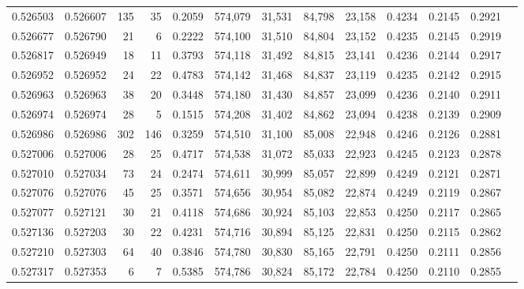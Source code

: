 \begin{tabular}{rrrrrrrrrrrrr}
0.526503 & 0.526607 &   135 &    35 &                                     0.2059 & 574,079 &  31,531 &  84,798 &  23,158 & 0.4234 & 0.2145 & 0.2921 \\
0.526677 & 0.526790 &    21 &     6 &                                     0.2222 & 574,100 &  31,510 &  84,804 &  23,152 & 0.4235 & 0.2145 & 0.2919 \\
0.526817 & 0.526949 &    18 &    11 &                                     0.3793 & 574,118 &  31,492 &  84,815 &  23,141 & 0.4236 & 0.2144 & 0.2917 \\
0.526952 & 0.526952 &    24 &    22 &                                     0.4783 & 574,142 &  31,468 &  84,837 &  23,119 & 0.4235 & 0.2142 & 0.2915 \\
0.526963 & 0.526963 &    38 &    20 &                                     0.3448 & 574,180 &  31,430 &  84,857 &  23,099 & 0.4236 & 0.2140 & 0.2911 \\
0.526974 & 0.526974 &    28 &     5 &                                     0.1515 & 574,208 &  31,402 &  84,862 &  23,094 & 0.4238 & 0.2139 & 0.2909 \\
0.526986 & 0.526986 &   302 &   146 &                                     0.3259 & 574,510 &  31,100 &  85,008 &  22,948 & 0.4246 & 0.2126 & 0.2881 \\
0.527006 & 0.527006 &    28 &    25 &                                     0.4717 & 574,538 &  31,072 &  85,033 &  22,923 & 0.4245 & 0.2123 & 0.2878 \\
0.527010 & 0.527034 &    73 &    24 &                                     0.2474 & 574,611 &  30,999 &  85,057 &  22,899 & 0.4249 & 0.2121 & 0.2871 \\
0.527076 & 0.527076 &    45 &    25 &                                     0.3571 & 574,656 &  30,954 &  85,082 &  22,874 & 0.4249 & 0.2119 & 0.2867 \\
0.527077 & 0.527121 &    30 &    21 &                                     0.4118 & 574,686 &  30,924 &  85,103 &  22,853 & 0.4250 & 0.2117 & 0.2865 \\
0.527136 & 0.527203 &    30 &    22 &                                     0.4231 & 574,716 &  30,894 &  85,125 &  22,831 & 0.4250 & 0.2115 & 0.2862 \\
0.527210 & 0.527303 &    64 &    40 &                                     0.3846 & 574,780 &  30,830 &  85,165 &  22,791 & 0.4250 & 0.2111 & 0.2856 \\
0.527317 & 0.527353 &     6 &     7 &                                     0.5385 & 574,786 &  30,824 &  85,172 &  22,784 & 0.4250 & 0.2110 & 0.2855 \\

\end{tabular}
